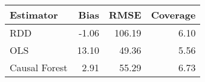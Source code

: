 \begin{table}[ht]
\centering
\begin{tabular}{lrrr}
  \hline
Estimator & Bias & RMSE & Coverage \\ 
  \hline
RDD & -1.06 & 106.19 & 6.10 \\ 
  OLS & 13.10 & 49.36 & 5.56 \\ 
  Causal Forest & 2.91 & 55.29 & 6.73 \\ 
   \hline
\end{tabular}
\end{table}

